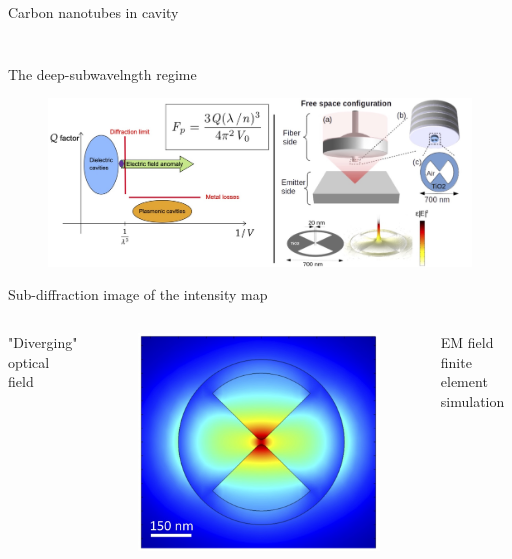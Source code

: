 \documentclass[xcolor = {dvipsnames}]{beamer}
\begin{document}
\begin{frame}{Carbon nanotubes in cavity}
\begin{columns}
\begin{column}{0.4\textwidth}
\begin{figure}
  \end{figure}
  \end{column}
  \end{columns}
\end{frame}

\begin{frame}{The deep-subwavelngth regime}
	\begin{figure}[h!]
		\centering
    \includegraphics[width=1\textwidth]{images/fine}
	\end{figure}
\end{frame}



\begin{frame}[t]{Sub-diffraction image of the intensity map}
\begin{columns}

\centering "Diverging" optical field

\begin{figure}[h!]
\centering
\includegraphics[width=1\textwidth]{images/intensity}
\end{figure}
\centering
EM field finite element simulation
\end{columns}
\end{frame}
\end{document}
